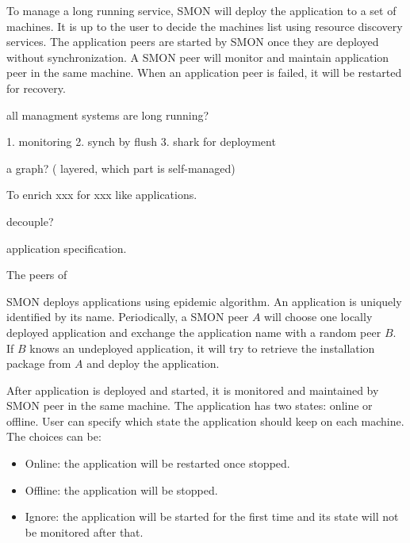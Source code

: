 To manage a long running service, SMON will deploy the
application to a set of machines. It is up to the user to
decide the machines list using resource discovery services.
The application peers are started by SMON once they are
deployed without synchronization. A SMON peer will monitor
and maintain application peer in the same machine. When an
application peer is failed, it will be restarted for
recovery.

all managment systems are long running?

1. monitoring
2. synch by flush
3. shark for deployment

a graph? ( layered, which part is self-managed)


To enrich xxx for xxx like applications.

decouple?

application specification.


The
peers of 

SMON deploys applications using epidemic algorithm.  An
application is uniquely identified by its name.
Periodically, a SMON peer $A$ will choose one locally
deployed application and exchange the application name with
a random peer $B$. If $B$ knows an undeployed application,
it will try to retrieve the installation package from $A$
and deploy the application.



After application is deployed and started, it is monitored
and maintained by SMON peer in the same machine.  The
application has two states: online or offline.  User can
specify which state the application should keep on each
machine. The choices can be:

\begin{itemize}
  \item Online: the application will be restarted once
  stopped.
  \item Offline: the application will be stopped.
  \item Ignore: the application will be started for the
  first time and its state will not be monitored after
  that.
\end{itemize}

